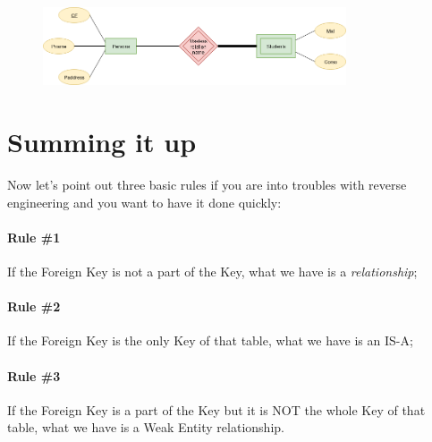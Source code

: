 \documentclass[class=book, crop=false, oneside]{standalone}
\begin{document}
\begin{figure}[H]
	\includegraphics[width=0.8\textwidth,keepaspectratio]{diagram6_03.png}
	\caption{}
	\label{diagram6_03}
\end{figure}

\section{Summing it up}
Now let's point out three basic rules if you are into troubles with reverse engineering and you want to have it done quickly:
\paragraph{Rule \#1} If the Foreign Key is not a part of the Key, what we have is a \emph{relationship};
\paragraph{Rule \#2} If the Foreign Key is the only Key of that table, what we have is an IS-A;
\paragraph{Rule \#3} If the Foreign Key is a part of the Key but it is NOT the whole Key of that table, what we have is a Weak Entity relationship.
\end{document}
